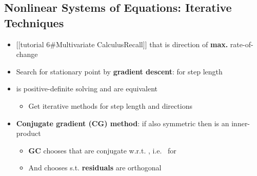 \subsection*{Nonlinear Systems of Equations: Iterative
  Techniques}

\begin{itemize}

  \item
        {[}{[}tutorial 6\#Multivariate Calculus\textbar Recall{]}{]} that
         is direction of \textbf{max.}
        rate-of-change 
  \item
        Search for stationary point by \textbf{gradient descent}:
        for step length \iMbox{\alpha}
  \item
         is positive-definite solving
         and
        are equivalent

        \begin{itemize}

          \item
                Get iterative methods
                for step length  and directions
        \end{itemize}
  \item
        \textbf{Conjugate gradient (CG) method}: if
         also symmetric then
        is an inner-product

        \begin{itemize}

          \item
                \textbf{GC} chooses  that are conjugate
                w.r.t. ,
                i.e.~
                for 
          \item
                And chooses  s.t. \textbf{residuals}
                are orthogonal


\end{itemize}
\end{itemize}
